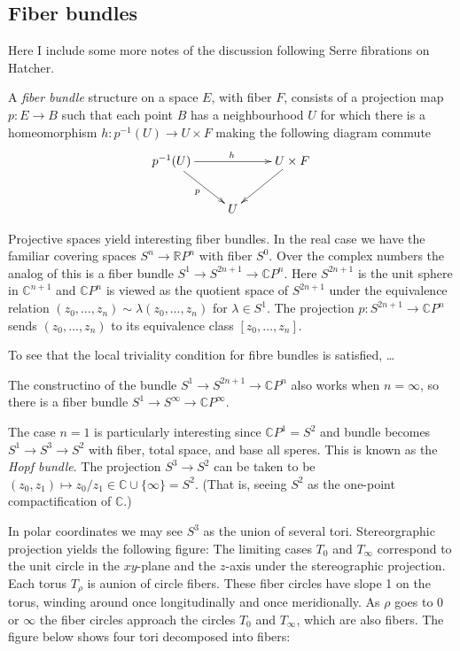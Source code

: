 \subsection{Fiber bundles}
\label{subsection-fiber-bundles}

Here I include some more notes of the
discussion following Serre fibrations on
Hatcher.

	A {\it fiber bundle} structure on a space
	$E$, with fiber $F$, consists of a
	projection map $p:E\to B$ such that each
	point $B$ has a neighbourhood $U$ for which
	there is a homeomorphism $h:p^{-1}(U)\to
	U\times F$ making the following diagram
	commute
	$$
	\xymatrix{
		p^{-1}(U)\ar[rr]^{h}\ar[dr]_{p}
		&&U\times F\ar[dl]\\
		&U
	}
	$$
\begin{example}
\label{example-proje-space-yield-inter}
Projective spaces yield interesting fiber
bundles. In the real case we have the
familiar covering spaces $S^n\to\mathbb{R}
P^n$ with fiber $S^0$. Over the complex
numbers the analog of this is a fiber bundle
$S^1\to S^{2n+1}\to\mathbb{C} P^n$. Here
$S^{2n+1}$ is the unit sphere in
$\mathbb{C}^{n+1}$ and $\mathbb{C} P^n$ is
viewed as the quotient space of $S^{2n+1}$
under the equivalence relation
$(z_0,\ldots,z_n)\sim\lambda(z_0,\ldots,z_n)$
for $\lambda\in S^1$. The projection
$p:S^{2n+1}\to\mathbb{C} P^n$ sends
$(z_0,\ldots,z_n)$ to its equivalence class
$[z_0,\ldots,z_n]$.

To see that the local triviality condition
for fibre bundles is satisfied, …

	The constructino of the bundle $S^1\to
	S^{2n+1}\to\mathbb{C} P^n$ also works when
	$n=\infty$, so there is a fiber bundle
	$S^1\to S^{\infty}\to \mathbb{C} P^{\infty}$.

	The case $n=1$ is particularly interesting
	since $\mathbb{C} P^1=S^2$ and bundle
	becomes $S^1\to S^3\to S^2$ with fiber,
	total space, and base all speres. This is
	known as the {\it Hopf bundle}. The
	projection $S^3\to S^2$ can be taken to be
	$(z_0,z_1)\mapsto
	z_0/z_1\in\mathbb{C}\cup\{\infty\}=S^2$.
	(That is, seeing $S^2$ as the one-point
	compactification of $\mathbb{C}$.)

	In polar coordinates we may see $S^3$ as the
	union of several tori. Stereorgraphic
	projection yields the following figure:
	The limiting cases $T_0$ and $T_{\infty}$
	correspond to the unit circle in the
	$xy$-plane and the $z$-axis under the
	stereographic projection.	Each torus
	$T_\rho$ is aunion of circle fibers. These
	fiber circles have slope 1 on the torus,
	winding around once longitudinally and once
	meridionally. As $\rho$ goes to $0$ or
	$\infty$ the fiber circles approach the
	circles $T_0$ and $T_{\infty}$, which are also
	fibers. The figure below shows four tori
	decomposed into fibers:


\end{example}
